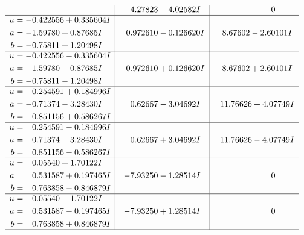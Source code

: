 \documentclass[1p]{elsarticle_modified}
\theoremstyle{definition}
\begin{document}
$$\begin{array}{c|c|c}
 & -4.27823 - 4.02582 I & \phantom{-0.000000 } 0 \\ \hline\begin{aligned}
u &= -0.422556 + 0.335604 I \\
a &= -1.59780 + 0.87685 I \\
b &= -0.75811 + 1.20498 I\end{aligned}
 & \phantom{-}0.972610 - 0.126620 I & \phantom{-}8.67602 - 2.60101 I \\ \hline\begin{aligned}
u &= -0.422556 - 0.335604 I \\
a &= -1.59780 - 0.87685 I \\
b &= -0.75811 - 1.20498 I\end{aligned}
 & \phantom{-}0.972610 + 0.126620 I & \phantom{-}8.67602 + 2.60101 I \\ \hline\begin{aligned}
u &= \phantom{-}0.254591 + 0.184996 I \\
a &= -0.71374 - 3.28430 I \\
b &= \phantom{-}0.851156 + 0.586267 I\end{aligned}
 & \phantom{-}0.62667 - 3.04692 I & \phantom{-}11.76626 + 4.07749 I \\ \hline\begin{aligned}
u &= \phantom{-}0.254591 - 0.184996 I \\
a &= -0.71374 + 3.28430 I \\
b &= \phantom{-}0.851156 - 0.586267 I\end{aligned}
 & \phantom{-}0.62667 + 3.04692 I & \phantom{-}11.76626 - 4.07749 I \\ \hline\begin{aligned}
u &= \phantom{-}0.05540 + 1.70122 I \\
a &= \phantom{-}0.531587 + 0.197465 I \\
b &= \phantom{-}0.763858 - 0.846879 I\end{aligned}
 & -7.93250 - 1.28514 I & \phantom{-0.000000 } 0 \\ \hline\begin{aligned}
u &= \phantom{-}0.05540 - 1.70122 I \\
a &= \phantom{-}0.531587 - 0.197465 I \\
b &= \phantom{-}0.763858 + 0.846879 I\end{aligned}
 & -7.93250 + 1.28514 I & \phantom{-0.000000 } 0\\
 \hline 
 \end{array}$$\newpage
\newpage\renewcommand{\arraystretch}{1}
\end{document}
